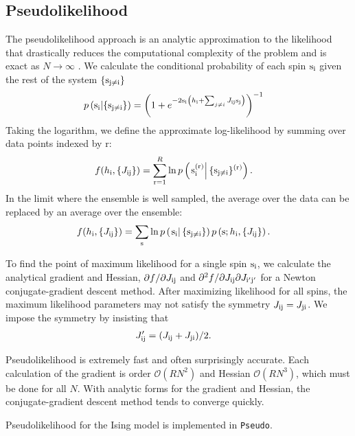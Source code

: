 \documentclass{jors}
\begin{document}
\subsection*{Pseudolikelihood}
The pseudolikelihood approach is an analytic approximation to the likelihood that drastically reduces the computational complexity of the problem and is exact as $N \rightarrow \infty$ \cite{Aurell:2012hi}. We calculate the conditional probability of each spin ${\rm s}_{\rm i}$ given the rest of the system $\{{\rm s}_{\rm j\neq i}\}$
\begin{align}
	p\left({\rm s}_{\rm i}|\{{\rm s}_{\rm j\neq i}\}\right) &= \left( 1+e^{-2{\rm s}_{\rm i} \left(h_{\rm i}+\sum_{j\neq i}J_{\rm ij}{\rm s}_{\rm j}\right)} \right)^{-1}
\end{align}
Taking the logarithm, we define the approximate log-likelihood by summing over data points indexed by r:
\begin{align}
	f(h_{\rm i},\{J_{\rm ij}\}) &= \sum_{\rm r=1}^R \ln p\left(\left.{\rm s}_{\rm i}^{(\rm r)}\right|\{{\rm s}_{\rm j\neq i}\}^{(\rm r)}\right).
\end{align}
In the limit where the ensemble is well sampled, the average over the data can be replaced by an average over the ensemble:
\begin{align}
	f(h_{\rm i},\{J_{\rm ij}\}) &= \sum_{\rm s} \ln p\left(\left.{\rm s}_{\rm i}\right|\{{\rm s}_{\rm j\neq i}\}\right)p\left({\rm s};h_{\rm i},\{J_{\rm ij}\}\right).
\end{align}

To find the point of maximum likelihood for a single spin ${\rm s}_{\rm i}$, we calculate the analytical gradient and Hessian, $\partial f/\partial J_{\rm ij}$ and $\partial^2 f/\partial J_{\rm ij}\partial J_{\rm i'j'}$ for a Newton conjugate-gradient descent method. After maximizing likelihood for all spins, the maximum likelihood parameters may not satisfy the symmetry $J_{\rm ij}=J_{\rm ji}$. We impose the symmetry by insisting that
\begin{align}
	J_{\rm ij}' &= (J_{\rm ij}+J_{\rm ji})/2.
\end{align}

Pseudolikelihood is extremely fast and often surprisingly accurate. Each calculation of the gradient is order $\mathcal{O}(RN^2)$ and Hessian $\mathcal{O}(RN^3)$, which must be done for all $N$. With analytic forms for the gradient and Hessian, the conjugate-gradient descent method tends to converge quickly.

Pseudolikelihood for the Ising model is implemented in {\tt Pseudo}.
\end{document}
